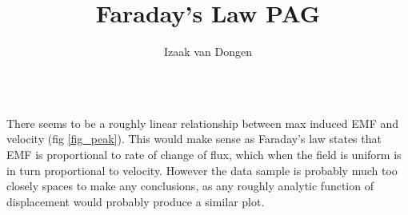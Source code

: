 \documentclass[a4paper,11pt]{article}
\title{Faraday's Law PAG}
\author{Izaak van Dongen}
\newenvironment{longlisting}
{\addvspace{\baselineskip}\captionsetup{type=listing}}
{\addvspace{\baselineskip}}
\begin{document}
    \maketitle%

\begin{longlisting}
\inputminted{R}{analyse.r}
\end{longlisting}

There seems to be a roughly linear relationship between max induced EMF and
velocity (fig \ref{fig_peak}). This would make sense as Faraday's law states
that EMF is proportional to rate of change of flux, which when the field is
uniform is in turn proportional to velocity. However the data sample is probably
much too closely spaces to make any conclusions, as any roughly analytic
function of displacement would probably produce a similar plot.
\end{document}
